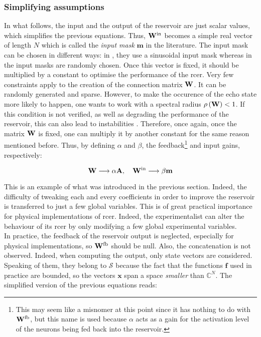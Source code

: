 
\subsubsection{Simplifying assumptions}

In what follows, the input and the output of the reservoir are just scalar values, which simplifies the previous equations. Thus, $\mathbf{W}^{\text{in}}$ becomes a simple real vector of length $N$ which is called the \textit{input mask} $\mathbf{m}$ in the literature. The input mask can be chosen in different ways: in \cite{Duport2016}, they use a sinusoidal input mask whereas in \cite{Antonik2017, Vinckier2015, Paquot2012} the input masks are randomly chosen. Once this vector is fixed, it should be multiplied by a constant to optimise the performance of the \gls{rcer}. Very few constraints apply to the creation of the connection matrix $\mathbf{W}$. It can be randomly generated and sparse. However, to make the occurence of the echo state more likely to happen, one wants to work with a spectral radius $\rho \left( \mathbf{W} \right)<1$. If this condition is not verified, as well as degrading the performance of the reservoir, this can also lead to instabilities \cite{Lukoeviius2009}. Therefore, once again, once the matrix $\mathbf{W}$ is fixed, one can multiply it by another constant for the same reason mentioned before. Thus, by defining $\alpha$ and $\beta$,  the feedback\footnote{This may seem like a misnomer at this point since it has nothing to do with $\mathbf{W}^{\text{fb}}$, but this name is used because $\alpha$ acts as a gain for the activation level of the neurons being fed back into the reservoir.} and input gains, respectively:

\begin{equation}
	\mathbf{W} \longrightarrow \alpha \mathbf{A}, \quad \mathbf{W}^{\text{in}} \longrightarrow \beta \mathbf{m}
\end{equation}

This is an example of what was introduced in the previous section. Indeed, the difficulty of tweaking each and every coefficients in order to improve the reservoir is transferred to just a few global variables. This is of great practical importance for physical implementations of \gls{rcer}. Indeed, the experimentalist can alter the behaviour of its \gls{rcer} by only modifying a few global experimental variables.\\

In practice, the feedback of the reservoir output is neglected, especially for physical implementations, so $\mathbf{W}^{\text{fb}}$ should be null. Also, the concatenation is not observed. Indeed, when computing the output, only state vectors are considered. Speaking of them, they belong to $\mathcal{S}$ because the fact that the functions $\mathbf{f}$ used in practice are bounded, so the vectors $\mathbf{x}$ span a space \textit{smaller} than $\mathbb{C}^N$. The simplified version of the previous equations reads:


